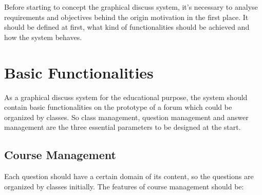 Before starting to concept the graphical discuss system, it's necessary to analyse requirements and objectives behind the origin motivation in the first place. It should be defined at first, what kind of functionalities should be achieved and how the system behaves.

\section{Basic Functionalities}

As a graphical discuss system for the educational purpose, the system should contain basic functionalities on the prototype  of a forum which could be organized by classes. So class management, question management and answer management are the three essential parameters to be designed at the start.

\subsection{Course Management}

Each question should have a certain domain of its content, so the questions are organized by classes initially. The features of course management should be:

